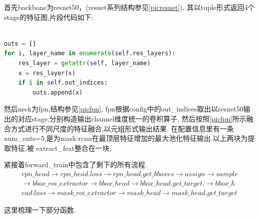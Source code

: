 \documentclass[UTF8]{ctexart}
\begin{document}
首先backbone为resnet50，(resnet系列结构参见\ref{picresnet}),
其以tuple形式返回4个stage的特征图,片段代码如下:
\lstset{style=mystyle}
\begin{lstlisting}[language=Python]

outs = []
for i, layer_name in enumerate(self.res_layers):
	res_layer = getattr(self, layer_name)
	x = res_layer(x)
	if i in self.out_indices:
		outs.append(x)

\end{lstlisting}

然后neck为fpn,结构参见\ref{picfpn},
fpn根据config中的out\_indices取出以resnet50输出的对应stage,分别构造输出channel维度统一的卷积算子,
然后按照\ref{picfpn}所示融合方式进行不同尺度的特征融合,以元组形式输出结果.
在配置信息里有一条num\_outs=5,是为mask-rcnn在最顶层特征增加的最大池化特征输出.以上两块为提取特征,被
extract\_feat整合在一块,



紧接着forward\_train中包含了剩下的所有流程.
\begin{equation*}
	\begin{aligned}
		 rpn\_head \rightarrow rpn\_head.loss \rightarrow rpn\_head.get\_bboxes \rightarrow assign \rightarrow sample \\
		\rightarrow bbox\_roi\_extractor \rightarrow  bbox\_head \rightarrow bbox\_head.get\_target. \rightarrow bbox\_h\\
		ead.loss \rightarrow mask\_roi\_extractor \rightarrow mask\_head \rightarrow mask\_head.get\_target
	\end{aligned}
\end{equation*} 

这里梳理一下部分函数.
\end{document}

